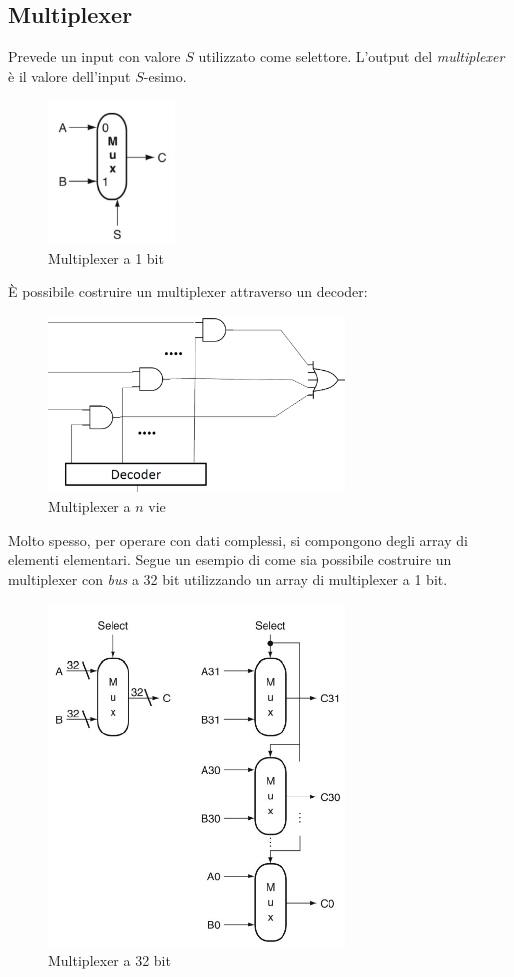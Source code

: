 \documentclass[class=book, crop=false]{standalone}
\begin{document}
\subsection*{Multiplexer}
Prevede un input con valore \(S\) utilizzato come selettore. L'output del \emph{multiplexer} è il valore dell'input \(S\)-esimo.
\begin{figure}[H]
	\centering
	\includegraphics[width=0.3\textwidth,keepaspectratio]{multi.png}
	\caption{Multiplexer a 1 bit}
\end{figure}
\`{E} possibile costruire un multiplexer attraverso un decoder:
\begin{figure}[H]
	\centering
	\includegraphics[width=0.7\textwidth,keepaspectratio]{multi_n_vie.png}
	\caption{Multiplexer a $n$ vie}
\end{figure}
Molto spesso, per operare con dati complessi, si compongono degli array di elementi elementari. Segue un esempio di come sia possibile costruire un multiplexer con \emph{bus} a 32 bit utilizzando un array di multiplexer a 1 bit.
\begin{figure}[H]
	\centering
	\includegraphics[width=0.7\textwidth,keepaspectratio]{mux_32bit.png}
	\caption{Multiplexer a 32 bit}
\end{figure}
\end{document}
